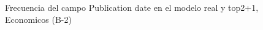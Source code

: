 \begin{figure}[H]
    \centering
    
    \caption{Frecuencia del campo Publication date en el modelo real y top2+1, Economicos (B-2)}
    \label{frecuency-Publication Date-top2+1}
\end{figure}